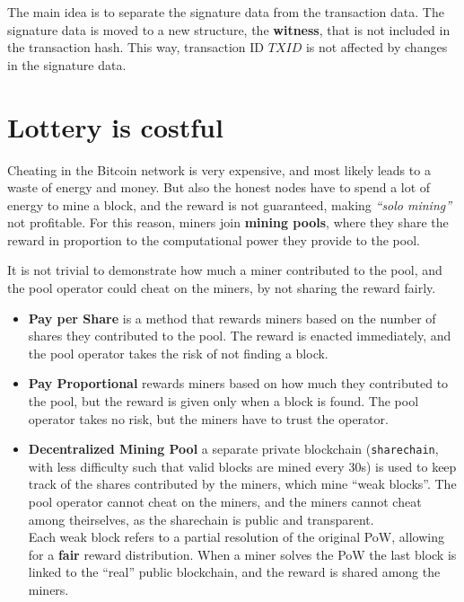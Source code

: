 The main idea is to separate the signature data from the transaction data. The signature data is moved to a new structure, the \textbf{witness}, that is not included in the transaction hash. This way, transaction ID $TXID$ is not affected by changes in the signature data.

\section{Lottery is costful}

Cheating in the Bitcoin network is very expensive, and most likely leads to a waste of energy and money.
But also the honest nodes have to spend a lot of energy to mine a block, and the reward is not guaranteed, making \textit{``solo mining''} not profitable.
For this reason, miners join \textbf{mining pools}, where they share the reward in proportion to the computational power they provide to the pool.

It is not trivial to demonstrate how much a miner contributed to the pool, and the pool operator could cheat on the miners, by not sharing the reward fairly.
\begin{itemize}
   \item \textbf{Pay per Share} is a method that rewards miners based on the number of shares they contributed to the pool. The reward is enacted immediately, and the pool operator takes the risk of not finding a block.
   \item \textbf{Pay Proportional} rewards miners based on how much they contributed to the pool, but the reward is given only when a block is found. The pool operator takes no risk, but the miners have to trust the operator.
   \item \textbf{Decentralized Mining Pool} a separate private blockchain (\texttt{sharechain}, with less difficulty such that valid blocks are mined every 30s) is used to keep track of the shares contributed by the miners, which mine ``weak blocks''. The pool operator cannot cheat on the miners, and the miners cannot cheat among theirselves, as the sharechain is public and transparent.\\
   Each weak block refers to a partial resolution of the original PoW, allowing for a \textbf{fair} reward distribution.
   When a miner solves the PoW the last block is linked to the ``real'' public blockchain, and the reward is shared among the miners.
\end{itemize}